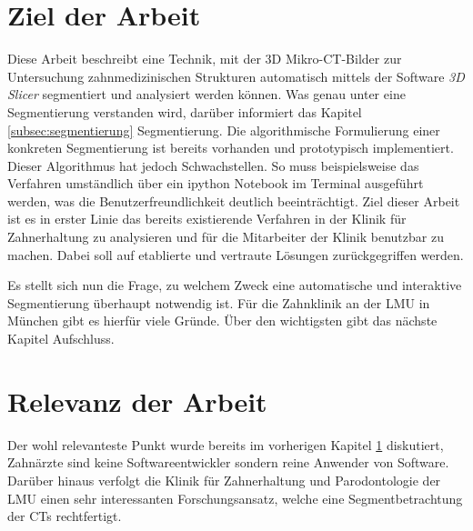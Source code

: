 \section{Ziel der Arbeit}
\label{sec:ziel_der_arbeit} Diese Arbeit beschreibt eine Technik, mit der \ac{3D}
Mikro-\ac{CT}-Bilder zur Untersuchung zahnmedizinischen Strukturen automatisch
mittels der Software \textit{3D Slicer} segmentiert und analysiert werden können.
Was genau unter eine Segmentierung verstanden wird, darüber informiert das Kapitel
\ref{subsec:segmentierung} Segmentierung. Die algorithmische Formulierung einer
konkreten Segmentierung ist bereits vorhanden und prototypisch implementiert. Dieser
Algorithmus hat jedoch Schwachstellen. So muss beispielsweise das Verfahren
umständlich über ein ipython Notebook im Terminal ausgeführt werden, was die Benutzerfreundlichkeit
deutlich beeinträchtigt. Ziel dieser Arbeit ist es in erster Linie das bereits
existierende Verfahren in der Klinik für Zahnerhaltung zu analysieren und für
die Mitarbeiter der Klinik benutzbar zu machen. Dabei soll auf etablierte und vertraute
Lösungen zurückgegriffen werden.

Es stellt sich nun die Frage, zu welchem Zweck eine automatische und interaktive
Segmentierung überhaupt notwendig ist. Für die Zahnklinik an der LMU in München gibt
es hierfür viele Gründe. Über den wichtigsten gibt das nächste Kapitel
Aufschluss.

\section{Relevanz der Arbeit}
\label{sec:relevanz_der_arbeit} Der wohl relevanteste Punkt wurde bereits im
vorherigen Kapitel \ref{sec:ziel_der_arbeit} diskutiert, Zahnärzte sind keine Softwareentwickler
sondern reine Anwender von Software. Darüber hinaus verfolgt die Klinik für
Zahnerhaltung und Parodontologie der \ac{LMU} einen sehr interessanten Forschungsansatz,
welche eine Segmentbetrachtung der \ac{CT}s rechtfertigt.

